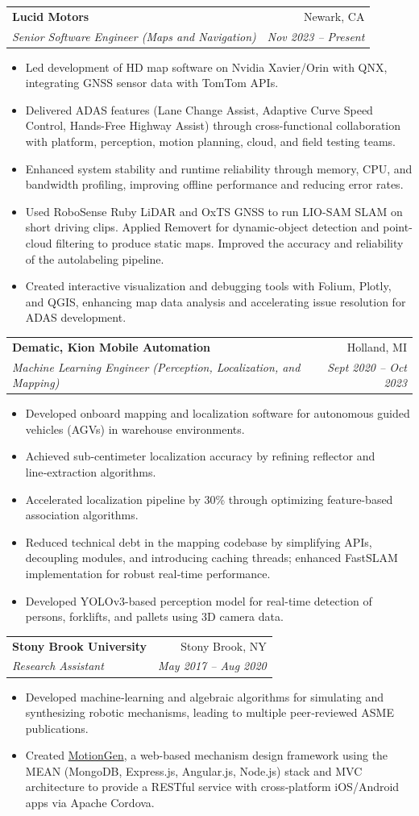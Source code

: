 \documentclass[letterpaper,10pt]{article}
\makeatletter
\newcommand{\resumeHeadingTwoLine}[4]{%
  \needspace{3\baselineskip}%
  \begin{tabular*}{\textwidth}{l@{\extracolsep{\fill}}r}
    \textbf{#1} & #2 \\
    \textit{\small #3} & \textit{\small #4}
  \end{tabular*}%
}
\newcommand{\resumeItem}[1]{\item\small #1}
\makeatother
\begin{document}
\resumeHeadingTwoLine
{Lucid Motors}{Newark, CA}
{Senior Software Engineer (Maps and Navigation)}{Nov 2023 -- Present}
\begin{itemize}
\resumeItem{Led development of HD map software on Nvidia Xavier/Orin with QNX, integrating GNSS sensor data with TomTom APIs.}
\resumeItem{Delivered ADAS features (Lane Change Assist, Adaptive Curve Speed Control, Hands-Free Highway Assist) through cross-functional collaboration with platform, perception, motion planning, cloud, and field testing teams.}
\resumeItem{Enhanced system stability and runtime reliability through memory, CPU, and bandwidth profiling, improving offline performance and reducing error rates.}
\resumeItem{Used RoboSense Ruby LiDAR and OxTS GNSS to run LIO-SAM SLAM on short driving clips. Applied Removert for dynamic-object detection and point-cloud filtering to produce static maps. Improved the accuracy and reliability of the autolabeling pipeline.}
\resumeItem{Created interactive visualization and debugging tools with Folium, Plotly, and QGIS, enhancing map data analysis and accelerating issue resolution for ADAS development.}
\end{itemize}

\resumeHeadingTwoLine
{Dematic, Kion Mobile Automation}{Holland, MI}
{Machine Learning Engineer (Perception, Localization, and Mapping)}{Sept 2020 -- Oct 2023 }
\begin{itemize}
\resumeItem{Developed onboard mapping and localization software for autonomous guided vehicles (AGVs) in warehouse environments.}
\resumeItem{Achieved sub‑centimeter localization accuracy by refining reflector and line‑extraction algorithms.}
\resumeItem{Accelerated localization pipeline by 30\% through optimizing feature-based association algorithms.}
\resumeItem{Reduced technical debt in the mapping codebase by simplifying APIs, decoupling modules, and introducing caching threads; enhanced FastSLAM implementation for robust real‑time performance.}
\resumeItem{Developed YOLOv3-based perception model for real-time detection of persons, forklifts, and pallets using 3D camera data.}
\end{itemize}

\resumeHeadingTwoLine
{Stony Brook University}{Stony Brook, NY}
{Research Assistant}{May 2017 -- Aug 2020}
\begin{itemize}
\resumeItem{Developed machine‑learning and algebraic algorithms for simulating and synthesizing robotic mechanisms, leading to multiple peer‑reviewed ASME publications.}
\resumeItem{Created \href{http://cadcam.eng.sunysb.edu/}{MotionGen}, a web-based mechanism design framework using the MEAN (MongoDB, Express.js, Angular.js, Node.js) stack and MVC architecture to provide a RESTful service  with cross‑platform iOS/Android apps via Apache Cordova.}
\end{itemize}
	
\end{document}
